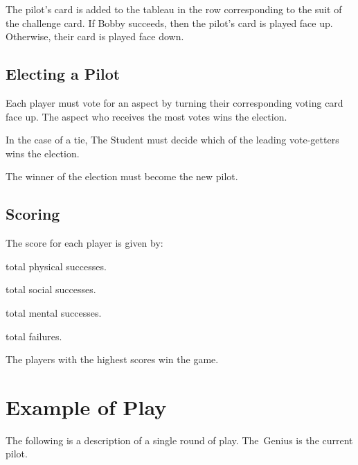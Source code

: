 \documentclass[a4paper, 10pt,notumble]{leaflet}
\begin{document}
The pilot's card is added to the tableau in the row corresponding to the suit of the challenge card. If Bobby succeeds, then the pilot's card is played face up.  Otherwise, their card is played face down. 

\subsection{Electing a Pilot}
Each player must vote for an aspect by turning their corresponding voting card face up.
The aspect who receives the most votes wins the election. 

In the case of a tie, The Student must decide which of the leading vote-getters wins the election. 

The winner of the election must become the new pilot.

\subsection{Scoring}
The score for each player is given by:
\begin{playerlistnarrow}
	\item[\normalfont{The Animal:}] total physical successes.
	\item[\normalfont{The Angel:}] total social successes.
	\item[\normalfont{The Genius:}] total mental successes.
	\item[\normalfont{The Student:}] total failures.
\end{playerlistnarrow}
The players with the highest scores win the game.
\newpage



\section{Example of Play}
The following is a description of a single round of play. The~Genius is the current pilot.
\end{document}
